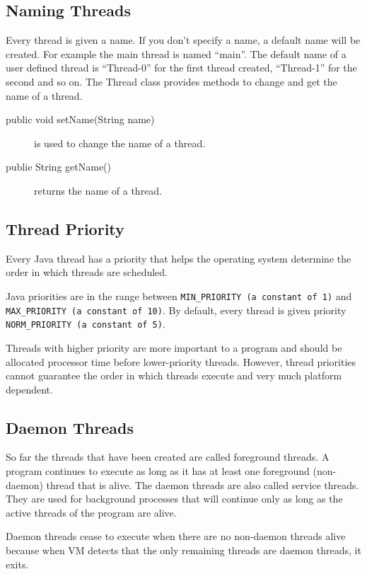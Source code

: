\documentclass[11pt,a4paper]{article}
\begin{document}
\subsection*{Naming Threads}
Every thread is given a name. If you don't specify a name, a default name will be created. For example the main thread is named ``main''.
The default name of a user defined thread is ``Thread-0'' for the first thread created, ``Thread-1'' for the second and so on. 
The Thread class provides methods to change and get the name of a thread. 
\begin{description}
\item [public void setName(String name)] is used to change the name of a thread.
\item [publie String getName()] returns the name of a thread.
\end{description}

\subsection*{Thread Priority}
Every Java thread has a priority that helps the operating system determine the order in which threads are scheduled.

Java priorities are in the range between \texttt{MIN\_PRIORITY (a constant of 1)} and \texttt{MAX\_PRIORITY (a constant of 10)}. By default, every thread is given priority \texttt{NORM\_PRIORITY (a constant of 5)}.

Threads with higher priority are more important to a program and should be allocated processor time before lower-priority threads. However, thread priorities cannot guarantee the order in which threads execute and very much platform dependent.


\subsection*{Daemon Threads}
So far the threads that have been created are called foreground threads. A program continues to execute as long as it has at least one
foreground (non-daemon) thread that is alive. The daemon threads are also called service threads. They are used for background processes that will continue only as long as the active threads of the program are alive.

Daemon threads cease to execute when there are no non-daemon threads alive because when VM detects that the only remaining threads are daemon threads, it exits. 
\end{document}
